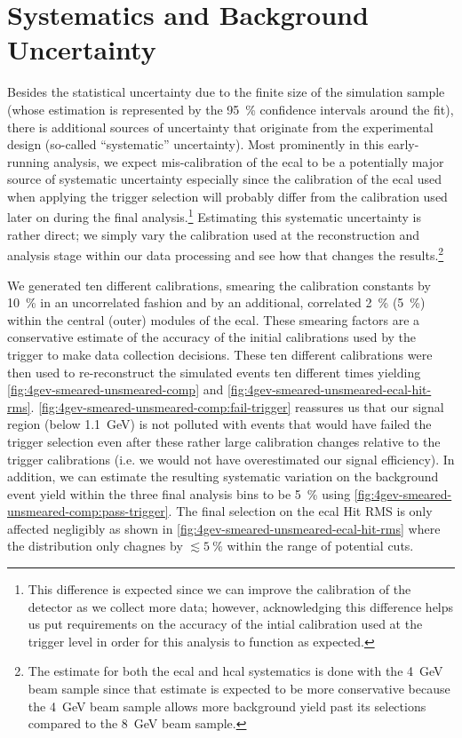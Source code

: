 \section{Systematics and Background Uncertainty}
Besides the statistical uncertainty due to the finite size of the simulation sample
(whose estimation is represented by the \qty{95}{\percent} confidence intervals around the fit),
there is additional sources of uncertainty that originate from the experimental design
(so-called ``systematic'' uncertainty).
Most prominently in this early-running analysis, we expect mis-calibration of the \ac{ecal}
to be a potentially major source of systematic uncertainty especially since the calibration
of the \ac{ecal} used when applying the trigger selection will probably differ from the
calibration used later on during the final analysis.\footnote{
  This difference is expected since we can improve the calibration of the detector as we
  collect more data; however, acknowledging this difference helps us put requirements on
  the accuracy of the intial calibration used at the trigger level in order for this
  analysis to function as expected.
}
Estimating this systematic uncertainty is rather direct; we simply vary the calibration
used at the reconstruction and analysis stage within our data processing and see how that
changes the results.\footnote{
  The estimate for both the \ac{ecal} and \ac{hcal} systematics is done with the
  \qty{4}{\GeV} beam sample since that estimate is expected to be more conservative
  because the \qty{4}{\GeV} beam sample allows more background yield past its selections
  compared to the \qty{8}{\GeV} beam sample.
}

We generated ten different calibrations, smearing the calibration constants by \qty{10}{\percent}
in an uncorrelated fashion and by an additional, correlated \qty{2}{\percent} (\qty{5}{\percent})
within the central (outer) modules of the \ac{ecal}.
These smearing factors are a conservative estimate of the accuracy of the initial calibrations
used by the trigger to make data collection decisions.
These ten different calibrations were then used to re-reconstruct the simulated events
ten different times yielding \cref{fig:4gev-smeared-unsmeared-comp}
and \cref{fig:4gev-smeared-unsmeared-ecal-hit-rms}.
\cref{fig:4gev-smeared-unsmeared-comp:fail-trigger} reassures us that our signal region
(below \qty{1.1}{\GeV}) is not polluted with events that would have failed the trigger
selection even after these rather large calibration changes relative to the trigger calibrations
(i.e. we would not have overestimated our signal efficiency).
In addition, we can estimate the resulting systematic variation on the background
event yield within the three final analysis bins to be \qty{5}{\percent} using
\cref{fig:4gev-smeared-unsmeared-comp:pass-trigger}.
The final selection on the \ac{ecal} Hit RMS is only affected negligibly as shown in
\cref{fig:4gev-smeared-unsmeared-ecal-hit-rms} where the distribution only chagnes by
$\lesssim\qty{5}{\percent}$ within the range of potential cuts.


